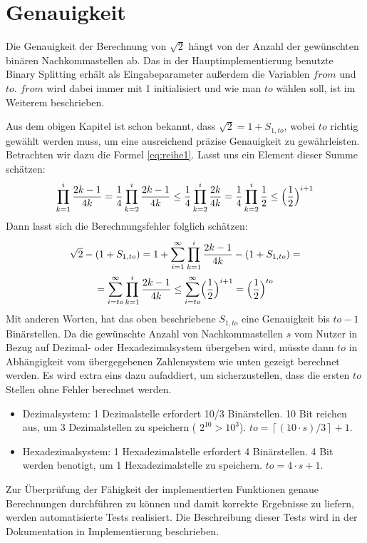 \documentclass[course=erap]{aspdoc}
\begin{document}
\section{Genauigkeit}
 Die Genauigkeit der Berechnung von $\sqrt{2}$ hängt von der Anzahl der gewünschten binären Nachkommastellen ab. Das in der Hauptimplementierung benutzte Binary Splitting erhält als Eingabeparameter außerdem die Variablen $from$ und $to$. $from$ wird dabei immer mit 1 initialisiert und wie man $to$ wählen soll, ist im Weiterem beschrieben. 

 Aus dem obigen Kapitel ist schon bekannt, dass $\sqrt{2} = 1 + S_{1, to}$, wobei $to$ richtig gewählt werden muss, um eine ausreichend präzise Genauigkeit zu gewährleisten. Betrachten wir dazu die Formel \ref{eq:reihe1}. Lasst uns ein Element dieser Summe schätzen:
\begin{equation} 
\prod_{k = 1}^{i} {\frac{2k-1}{4k}} = \frac{1}{4}\prod_{k = 2}^{i} \frac{2k-1}{4k} \leq \frac{1}{4} \prod_{k = 2}^{i} \frac{2k}{4k} = \frac{1}{4}\prod_{k = 2}^{i} \frac{1}{2} \leq \Bigl(\frac{1}{2}\Bigr)^{i+1}
\end{equation}
Dann lasst sich die Berechnungsfehler folglich schätzen: 
\begin{multline}
\sqrt{2} - (1 + S_{1, to}) 
 = 1+\sum_{i=1}^{\infty}\prod_{k=1}^{i}\frac{2k-1}{4k}-(1+S_{1,to})=\\
 = \sum_{i=to}^{\infty}\prod_{k=1}^{i}\frac{2k-1}{4k} 
 \le \sum_{i=to}^{\infty} \Bigl(\frac{1}{2}\Bigr)^{i+1} = \Bigl(\frac{1}{2}\Bigr)^{to} 
\end{multline}
Mit anderen Worten, hat das oben beschriebene $S_{1, to}$  eine Genauigkeit bis $to-1$ Binärstellen. Da die gewünschte Anzahl von Nachkommastellen $s$ vom Nutzer in Bezug auf Dezimal- oder Hexadezimalsystem übergeben wird, müsste dann $to$ in Abhängigkeit vom übergegebenen Zahlensystem wie unten gezeigt berechnet werden. Es wird extra eins dazu aufaddiert, um sicherzustellen, dass die ersten $to$ Stellen  ohne Fehler berechnet werden.
\begin{itemize}
    \item Dezimalsystem: 1 Dezimalstelle erfordert  10/3 Binärstellen. 10 Bit reichen aus, um 3 Dezimalstellen zu speichern ( $2^{10} > 10^{3}$). $to = 
    \left\lceil (10\cdot s) / 3 \right \rceil + 1$. 
    \item Hexadezimalsystem: 1 Hexadezimalstelle erfordert 4 Binärstellen. 4 Bit werden benotigt, um 1 Hexadezimalstelle zu speichern. $to = 4\cdot s + 1$.
\end{itemize}
Zur Überprüfung der Fähigkeit der implementierten Funktionen genaue Berechnungen durchführen zu können und damit korrekte Ergebnisse zu liefern, werden automatisierte Tests realisiert. Die Beschreibung dieser Tests wird in der Dokumentation in Implementierung beschrieben.
\end{document}
